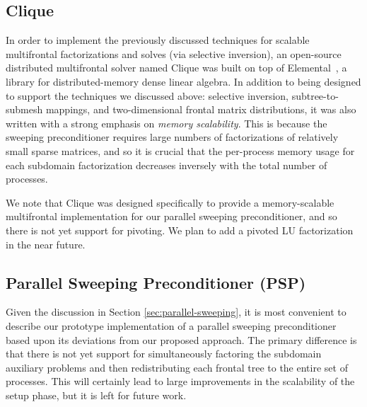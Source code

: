 \subsection{Clique}
In order to implement the previously discussed techniques for scalable 
multifrontal factorizations and solves (via selective inversion), an 
open-source distributed multifrontal solver named Clique was built on top of 
Elemental~\cite{Poulson-elemental}, a library for distributed-memory dense 
linear algebra.  In addition to being designed to support the techniques 
we discussed above: selective inversion, subtree-to-submesh mappings, and 
two-dimensional frontal matrix distributions, it was also written with 
a strong emphasis on {\em memory scalability}. This is because the 
sweeping preconditioner requires large numbers of factorizations 
of relatively small sparse matrices, and so it is crucial that the per-process
memory usage for each subdomain factorization decreases inversely with the 
total number of processes.

We note that Clique was designed specifically to provide a memory-scalable 
multifrontal implementation for our parallel sweeping preconditioner, and so
there is not yet support for pivoting. We plan to add a pivoted LU factorization
in the near future.

\subsection{Parallel Sweeping Preconditioner (PSP)}
Given the discussion in Section \ref{sec:parallel-sweeping}, it is most 
convenient to describe our prototype implementation of a parallel sweeping 
preconditioner based upon its deviations from our proposed approach. The 
primary difference is that there is not yet support for simultaneously 
factoring the subdomain auxiliary problems and then redistributing each frontal
tree to the entire set of processes. This will certainly lead to large
improvements in the scalability of the setup phase, but it is left for future 
work.

